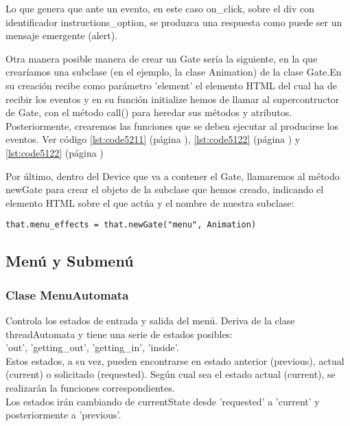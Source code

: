 Lo que genera que ante un evento, en este caso on\_click, sobre el div con identificador instructions\_option, se produzca  una respuesta como 
puede ser un mensaje emergente (alert).

Otra manera posible manera de crear un Gate sería la siguiente, en la que crearíamos una subclase (en el ejemplo, la clase Animation) de la 
clase Gate.En su creación recibe como parámetro 'element' el elemento HTML del cual ha de recibir los eventos y en su función initialize hemos 
de llamar al supercontructor de Gate, con el método call() para heredar sus métodos y atributos.
Posteriormente, crearemos las funciones que se deben ejecutar al producirse los eventos. Ver código \ref{lst:code5211} 
(página \pageref{lst:code5211}), \ref{lst:code5122} (página \pageref{lst:code5122}) y \ref{lst:code5122} 
(página \pageref{lst:code5122})


Por último, dentro del Device que va a contener el Gate, llamaremos al método newGate para crear el objeto de la subclase que hemos creado, 
indicando el elemento HTML sobre el que actúa y el nombre de nuestra subclase:

\begin{verbatim}
that.menu_effects = that.newGate("menu", Animation)
\end{verbatim}


\subsection{Menú y Submenú}
\label{subsection:menu}

\subsubsection{Clase MenuAutomata}
\label{subsubsection:menu_automata}

Controla los estados de entrada y salida del menú. Deriva de la clase threadAutomata y tiene una serie de estados posibles:\\
'out', 'getting\_out', 'getting\_in', 'inside'.\\
Estos estados, a su vez, pueden encontrarse en estado anterior (previous), actual (current) o solicitado (requested). Según cual sea  el estado 
actual (current), se realizarán la funciones correspondientes.\\

Los estados irán cambiando de currentState desde 'requested' a 'current' y posteriormente a 'previous'.

